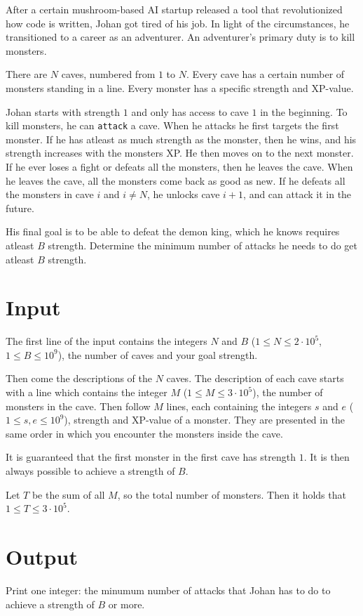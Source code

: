 \noindent

After a certain mushroom-based AI startup released a tool that revolutionized how code is written, Johan got tired of his job.
In light of the circumstances, he transitioned to a career as an adventurer. 
An adventurer's primary duty is to kill monsters.

There are $N$ caves, numbered from $1$ to $N$.
Every cave has a certain number of monsters standing in a line.
Every monster has a specific strength and XP-value.

Johan starts with strength $1$ and only has access to cave $1$ in the beginning.
To kill monsters, he can \texttt{attack} a cave.
When he attacks he first targets the first monster.
If he has atleast as much strength as the monster, then he wins, and his strength increases with the monsters XP. 
He then moves on to the next monster.
If he ever loses a fight or defeats all the monsters, then he leaves the cave.
When he leaves the cave, all the monsters come back as good as new. 
If he defeats all the monsters in cave $i$ and $i \neq N$, he unlocks cave $i+1$, and can attack it in the future. 

His final goal is to be able to defeat the demon king, which he knows requires atleast $B$ strength. 
Determine the minimum number of attacks he needs to do get atleast $B$ strength.

\section*{Input}
The first line of the input contains the integers $N$ and $B$ ($1 \leq N \leq 2 \cdot 10^5$, $1 \leq B \leq 10^9$),
the number of caves and your goal strength.

Then come the descriptions of the $N$ caves. 
The description of each cave starts with a line which contains the integer $M$ ($1 \leq M \leq 3 \cdot 10^5$), the number of monsters in the cave. 
Then follow $M$ lines, each containing the integers $s$ and $e$ ($1 \leq s,e \leq 10^9$),
strength and XP-value of a monster.
They are presented in the same order in which you encounter the monsters inside the cave.

It is guaranteed that the first monster in the first cave has strength $1$. 
It is then always possible to achieve a strength of $B$.

Let $T$ be the sum of all $M$, so the total number of monsters. Then it holds that $1 \leq T \leq 3 \cdot 10^5$.

\section*{Output}
Print one integer: the minumum number of attacks that Johan has to do to achieve a strength of $B$ or more.

